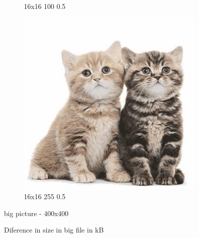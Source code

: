 \documentclass[12pt,a4paper]{article}
\begin{document}
\begin{figure}[htb]
\begin{subfigure}{0.25\textwidth}
  \caption{16x16 100 0.5}
  \label{fig:6}
\end{subfigure}
\begin{subfigure}{0.25\textwidth}
  \includegraphics[width=\linewidth]{images/big/16-16-255-05}
  \caption{16x16 255 0.5}
  \label{fig:5}
\end{subfigure}\hfil %


\caption{big picture - 400x400}
\label{fig:images}
\end{figure}

\begin{figure}
    \begin{bchart}[max=500]
            \smallskip
            \smallskip
            \smallskip
            \smallskip
            \smallskip
            \smallskip
            \smallskip
            \smallskip
            \smallskip
            \smallskip
            \smallskip
            \smallskip
    \end{bchart}
    \caption{Diference in size in big file in kB}
    \end{figure}
    
\end{document}
